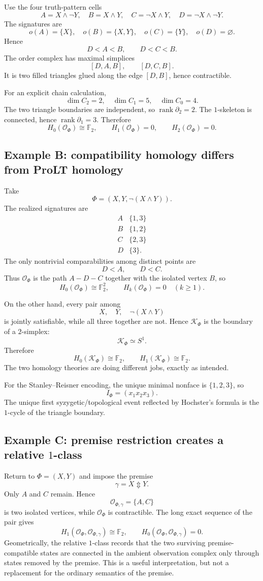 \documentclass[11pt]{article}
\theoremstyle{definition}
\newcommand{\F}{\mathbb F_2}
\newcommand{\OX}{\mathcal O}
\newcommand{\K}{\mathcal K}
\newcommand{\rank}{\operatorname{rank}}
\newcommand{\xor}{\mathbin{\Updownarrow}}
\begin{document}
Use the four truth-pattern cells
\[
A=X\wedge\neg Y,\quad B=X\wedge Y,\quad
C=\neg X\wedge Y,\quad D=\neg X\wedge\neg Y.
\]
The signatures are
\[
o(A)=\{X\},\quad o(B)=\{X,Y\},\quad
o(C)=\{Y\},\quad o(D)=\varnothing.
\]
Hence
\[
D<A<B,\qquad D<C<B.
\]
The order complex has maximal simplices
\[
[D,A,B],\qquad[D,C,B].
\]
It is two filled triangles glued along the edge $[D,B]$, hence contractible.

For an explicit chain calculation,
\[
\dim C_2=2,\quad\dim C_1=5,\quad\dim C_0=4.
\]
The two triangle boundaries are independent, so $\rank\partial_2=2$. The $1$-skeleton is connected, hence $\rank\partial_1=3$. Therefore
\[
H_0(\OX_\Phi)\cong\F,
\qquad H_1(\OX_\Phi)=0,
\qquad H_2(\OX_\Phi)=0.
\]

\subsection{Example B: compatibility homology differs from ProLT homology}

Take
\[
\Phi=(X,Y,\neg(X\wedge Y)).
\]
The realized signatures are
\[
\begin{array}{c|c}
A&\{1,3\}\\
B&\{1,2\}\\
C&\{2,3\}\\
D&\{3\}.
\end{array}
\]
The only nontrivial comparabilities among distinct points are
\[
D<A,\qquad D<C.
\]
Thus $\OX_\Phi$ is the path $A-D-C$ together with the isolated vertex $B$, so
\[
H_0(\OX_\Phi)\cong\F^2,
\qquad H_k(\OX_\Phi)=0\quad(k\ge1).
\]

On the other hand, every pair among
\[
X,\quad Y,\quad\neg(X\wedge Y)
\]
is jointly satisfiable, while all three together are not. Hence $\K_\Phi$ is the boundary of a $2$-simplex:
\[
\K_\Phi\simeq S^1.
\]
Therefore
\[
H_0(\K_\Phi)\cong\F,
\qquad H_1(\K_\Phi)\cong\F.
\]
The two homology theories are doing different jobs, exactly as intended.

For the Stanley--Reisner encoding, the unique minimal nonface is $\{1,2,3\}$, so
\[
I_\Phi=(x_1x_2x_3).
\]
The unique first syzygetic/topological event reflected by Hochster's formula is the $1$-cycle of the triangle boundary.

\subsection{Example C: premise restriction creates a relative $1$-class}

Return to $\Phi=(X,Y)$ and impose the premise
\[
\gamma=X\xor Y.
\]
Only $A$ and $C$ remain. Hence
\[
\OX_{\Phi,\gamma}=\{A,C\}
\]
is two isolated vertices, while $\OX_\Phi$ is contractible. The long exact sequence of the pair gives
\[
H_1(\OX_\Phi,\OX_{\Phi,\gamma})\cong\F,
\qquad
H_0(\OX_\Phi,\OX_{\Phi,\gamma})=0.
\]
Geometrically, the relative $1$-class records that the two surviving premise-compatible states are connected in the ambient observation complex only through states removed by the premise. This is a useful interpretation, but not a replacement for the ordinary semantics of the premise.
\end{document}
